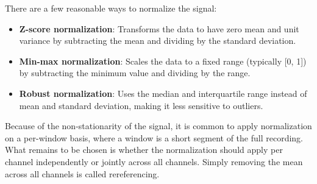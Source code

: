 There are a few reasonable ways to normalize the signal:
\begin{itemize}
  \item \textbf{Z-score normalization}: Transforms the data to have zero mean and unit variance by subtracting the mean and dividing by the standard deviation.
  \item \textbf{Min-max normalization}: Scales the data to a fixed range (typically [0, 1]) by subtracting the minimum value and dividing by the range.
  \item \textbf{Robust normalization}: Uses the median and interquartile range instead of mean and standard deviation, making it less sensitive to outliers.
\end{itemize}
Because of the non-stationarity of the signal, it is common to apply normalization on a per-window basis, where a window is a short segment of the full recording.
What remains to be chosen is whether the normalization should apply per channel independently or jointly across all channels.
Simply removing the mean across all channels is called rereferencing.





